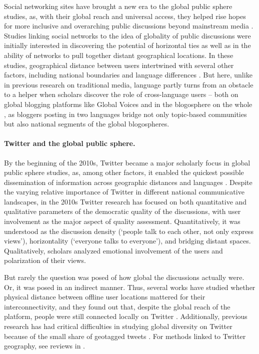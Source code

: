 Social networking sites have brought a new era to the global public sphere studies, as, with their global reach and universal access, they helped rise hopes for more inclusive and overarching public discussions beyond mainstream media \cite{Fuchs2014}. Studies linking social networks to the idea of globality of public discussions were initially interested in discovering the potential of horizontal ties as well as in the ability of networks to pull together distant geographical locations. In these studies, geographical distance between users intertwined with several other factors, including national boundaries and language differences \cite{TakhteyevGruzdWellman}. But here, unlike in previous research on traditional media, language partly turns from an obstacle to a helper when scholars discover the role of cross-language users -- both on global blogging platforms like Global Voices \cite{Hale} and in the blogosphere on the whole \cite{HerringPaolilloRamosVielba,EtlingKellyFaris}, as bloggers posting in two languages bridge not only topic-based communities but also national segments of the global blogospheres.

\paragraph{Twitter and the global public sphere.} By the beginning of the 2010s, Twitter became a major scholarly focus in global public sphere studies, as, among other factors, it enabled the quickest possible dissemination of information across geographic distances and languages \cite{LotanGraeffAnanny,HongAhmedGurumurthy}. Despite the varying relative importance of Twitter in different national communicative landscapes, in the 2010s Twitter research has focused on both quantitative and qualitative parameters of the democratic quality of the discussions, with user involvement as the major aspect of quality assessment. Quantitatively, it was understood as the discussion density (‘people talk to each other, not only express views’), horizontality (‘everyone talks to everyone’), and bridging distant spaces. Qualitatively, scholars analyzed emotional involvement of the users \cite{Papacharissi} and polarization of their views.

But rarely the question was posed of how global the discussions actually were. Or, it was posed in an indirect manner. Thus, several works have studied whether physical distance between offline user locations mattered for their interconnectivity, and they found out that, despite the global reach of the platform, people were still connected locally on Twitter \cite{YardiBoyd}\cite[p.~7]{TakhteyevGruzdWellman}. Additionally, previous research has had critical difficulties in studying global diversity on Twitter because of the small share of geotagged tweets \cite{MalikLambaNakos,LeetaruWangCao}. For methods linked to Twitter geography, see reviews in \cite{LeetaruWangCao,HanCook,AdnanLongley,KinsellaMurdockOHare,HongAhmedGurumurthy}.

